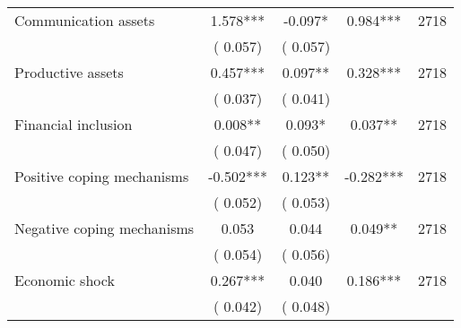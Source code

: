 \begin{tabular}{l*{4}{c}}
 Communication assets &              1.578*** &        -0.097* &           0.984*** & 2718                       \\  
                 &        (       0.057)                   &        (       0.057)                        &                                                             &                                                      \\      

 Productive assets &              0.457*** &         0.097** &           0.328*** & 2718                       \\  
                 &        (       0.037)                   &        (       0.041)                        &                                                             &                                                      \\      

 Financial inclusion &              0.008** &         0.093* &           0.037** & 2718                       \\  
                 &        (       0.047)                   &        (       0.050)                        &                                                             &                                                      \\      

 Positive coping mechanisms &             -0.502*** &         0.123** &          -0.282*** & 2718                       \\  
                 &        (       0.052)                   &        (       0.053)                        &                                                             &                                                      \\      

 Negative coping mechanisms &              0.053 &         0.044 &           0.049** & 2718                       \\  
                 &        (       0.054)                   &        (       0.056)                        &                                                             &                                                      \\      

 Economic shock &              0.267*** &         0.040 &           0.186*** & 2718                       \\  
                 &        (       0.042)                   &        (       0.048)                        &                                                             &                                                      \\      


\end{tabular}
